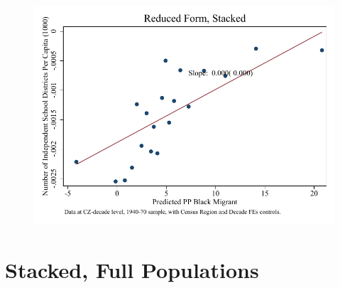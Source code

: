 \documentclass{article}
\begin{document}
\begin{figure}
\centering
\includegraphics{figures/simplefigs/stacked_schdist_ind_pc_C3_urban_rf.pdf}
\end{figure}
\clearpage



\clearpage
\section{Stacked, Full Populations}
\end{document}
